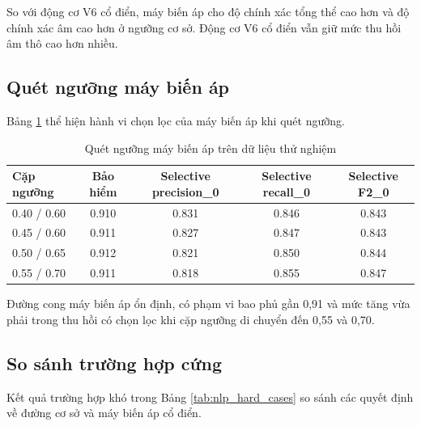 \documentclass[12pt,a4paper]{article}
\begin{document}
So với động cơ V6 cổ điển, máy biến áp cho độ chính xác tổng thể cao hơn và độ chính xác âm cao hơn ở ngưỡng cơ sở. Động cơ V6 cổ điển vẫn giữ mức thu hồi âm thô cao hơn nhiều.

\subsection{Quét ngưỡng máy biến áp}
Bảng \ref{tab:nlp_transformer_threshold} thể hiện hành vi chọn lọc của máy biến áp khi quét ngưỡng.

\begin{table}[H]
\centering
\caption{Quét ngưỡng máy biến áp trên dữ liệu thử nghiệm}
\label{tab:nlp_transformer_threshold}
\begin{tabular}{lcccc}
\toprule
Cặp ngưỡng & Bảo hiểm & Selective precision\_0 & Selective recall\_0 & Selective F2\_0 \\
\midrule
0.40 / 0.60 & 0.910 & 0.831 & 0.846 & 0.843 \\
0.45 / 0.60 & 0.911 & 0.827 & 0.847 & 0.843 \\
0.50 / 0.65 & 0.912 & 0.821 & 0.850 & 0.844 \\
0.55 / 0.70 & 0.911 & 0.818 & 0.855 & 0.847 \\
\bottomrule
\end{tabular}
\end{table}

Đường cong máy biến áp ổn định, có phạm vi bao phủ gần 0,91 và mức tăng vừa phải trong thu hồi có chọn lọc khi cặp ngưỡng di chuyển đến 0,55 và 0,70.

\subsection{So sánh trường hợp cứng}
Kết quả trường hợp khó trong Bảng \ref{tab:nlp_hard_cases} so sánh các quyết định về đường cơ sở và máy biến áp cổ điển.
\end{document}
